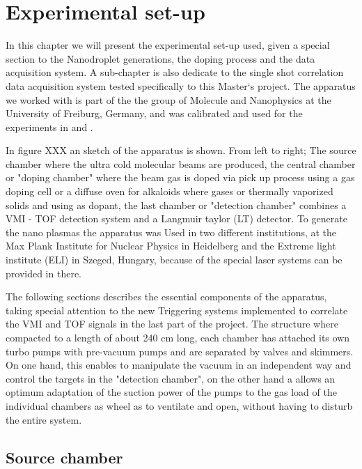 

\chapter{Experimental set-up}

In this chapter we will present the experimental set-up used, given a special section to  the Nanodroplet generations, the doping process and the data acquisition system. A  sub-chapter is also dedicate to the single shot correlation data acquisition system tested specifically to this Master`s project.
The apparatus we worked with is part of the the  group of Molecule and Nanophysics at the University of Freiburg, Germany, and was calibrated and used for the experiments in \cite{schomas_compact_2017} and \cite{heidenreich_charging_2016}.

In figure XXX an sketch of the apparatus is shown. From left to right; The source chamber where the  ultra cold molecular beams are produced, the central chamber or "doping chamber" where the beam gas is doped via pick up process using a gas doping cell or a diffuse oven for alkaloids where gases or thermally vaporized solids and using as dopant, the last  chamber or "detection chamber" combines a VMI - TOF detection system and a  Langmuir taylor (LT) detector.
To generate the nano plasmas the apparatus was Used in two different institutions, at the Max Plank Institute for Nuclear Physics in Heidelberg and the Extreme light institute (ELI) in Szeged, Hungary, because of the special laser systems can be provided in there.

The following sections describes the essential components of the apparatus, taking special attention to the new Triggering systems implemented to correlate the VMI and TOF signals in the last part of the project.  The structure where compacted to a length of about 240 cm long, each chamber has attached its own turbo pumps with  pre-vacuum pumps and are separated by valves and skimmers. On one hand, this enables to manipulate the vacuum in an independent way and control the targets in the "detection chamber", on the other hand a allows an optimum adaptation of the suction power of the pumps to the gas load of the individual chambers as wheel as to ventilate and open, without having to disturb the entire system.

\section{Source chamber}


